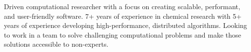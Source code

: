 
Driven computational researcher with a focus on creating scalable, performant,
and user-friendly software. 7+ years of experience in chemical research with 5+
years of experience developing high-performance, distributed algorithms.
Looking to work in a team to solve challenging computational problems and make
those solutions accessible to non-experts.
